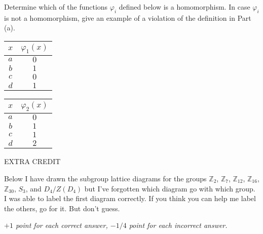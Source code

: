 \documentclass[fleqn,12pt]{article}
\newcommand{\<}{\ensuremath{\langle}}
\renewcommand{\>}{\ensuremath{\rangle}}
\newcommand{\Z}{\ensuremath{\mathbb{Z}}}
\begin{document}
\begin{enumerate}[{\bf 1.}]
\begin{enumerate}
Determine which of the functions $\varphi_i$ defined below is a homomorphism.
In case $\varphi_i$ is not a homomorphism, give an example of 
a violation of the definition in Part (a).

\medskip
\begin{center}
\begin{tabular}{c|c}
  $x$ & $\varphi_1(x)$ \\
\hline
  $a$ & $0$\\\hline
  $b$ & $1$\\\hline
  $c$ & $0$\\\hline
  $d$ & $1$
\end{tabular}
\hskip3cm
\begin{tabular}{c|c}
  $x$ & $\varphi_2(x)$ \\
\hline
  $a$ & $0$\\\hline
  $b$ & $1$\\\hline
  $c$ & $1$\\\hline
  $d$ & $2$
\end{tabular}
\end{center}

\end{enumerate}
  \end{enumerate}
\newpage
\begin{center}
  EXTRA CREDIT
\end{center}
Below I have drawn the subgroup lattice diagrams for the groups $\Z_2$,
$\Z_7$, $\Z_{12}$, $\Z_{16}$, $\Z_{30}$, $S_3$, and  $D_4/Z(D_4)$ but I've
forgotten which diagram go with which group.  I was able to label the first
diagram correctly.  If you think you can help me label the others, go for
it. But don't guess. 

\medskip

{\it $+1$ point for each correct answer, $-1/4$ point for each incorrect answer.} 

\bigskip
\end{document}
